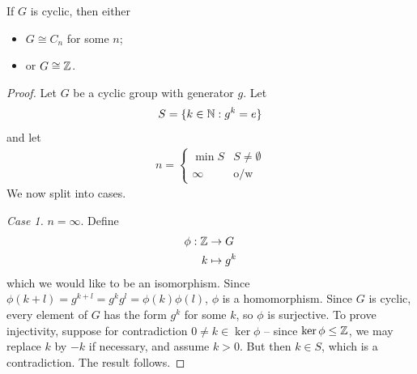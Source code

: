 \documentclass{../../template/note}
\begin{document}
    \begin{theorem}
        If \(G\) is cyclic, then either
        \begin{itemize}
            \item \(G \cong C_n\) for some \(n\);
            \item or \(G \cong \mathbb Z\).
        \end{itemize}
    \end{theorem}
    
    \begin{proof}
        Let \(G\) be a cyclic group with generator \(g\). Let
        \begin{align*}
            S = \{k \in \mathbb N: g^k = e\}
        \end{align*}
        and let
        \begin{align*}
            n = \begin{cases}
                \min S & S \neq \emptyset \\
                \infty & \text{o/w}
            \end{cases}
        \end{align*}
        We now split into cases.

        \emph{Case 1.} \(n = \infty\). Define
        \begin{align*}
            \phi: \mathbb Z &\to G \\
            k &\mapsto g^k
        \end{align*}
        which we would like to be an isomorphism. Since \(\phi(k+l) = g^{k+l} = g^kg^l = \phi(k)\phi(l)\), \(\phi\) is a homomorphism. Since \(G\) is cyclic, every element of \(G\) has the form \(g^k\) for some \(k\), so \(\phi\) is surjective. To prove injectivity, suppose for contradiction \(0 \neq k \in \ker \phi\) -- since \(\ker \phi \leq \mathbb Z\), we may replace \(k\) by \(-k\) if necessary, and assume \(k > 0\). But then \(k \in S\), which is a contradiction. The result follows.
        

\end{proof}
\end{document}
